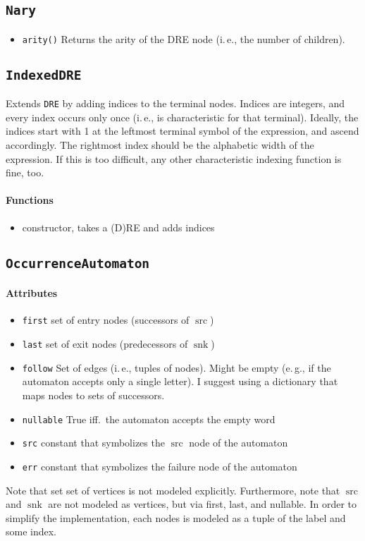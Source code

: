 \documentclass[a4paper,11pt, svgnames,titlepage]{article}
\DeclareMathOperator{\src}{src}
\DeclareMathOperator{\snk}{snk}
\begin{document}
\subsection{\texttt{Nary}}\label{sec:des:nary}
\begin{itemize}
	\item\texttt{arity()} Returns the arity of the DRE node (i.\,e., the number of children).
\end{itemize}


\subsection{\texttt{IndexedDRE}}\label{sec:des:idre}
Extends \texttt{DRE} by adding indices to the terminal nodes. Indices are integers, and every index occurs only once (i.\,e., is characteristic for that terminal). Ideally, the indices start with 1 at the leftmost terminal symbol of the expression, and ascend accordingly. The rightmost index should be the alphabetic width of the expression. If this is too difficult, any other characteristic indexing function is fine, too.
\paragraph{Functions}
\begin{itemize}
	\item constructor, takes a (D)RE and adds indices
\end{itemize}

\subsection{\texttt{OccurrenceAutomaton}}\label{sec:des:oa}
\paragraph{Attributes}
\begin{itemize}
	\item\texttt{first} set of entry nodes (successors of $\src$)
	\item\texttt{last} set of exit nodes (predecessors of $\snk$)
	\item\texttt{follow} Set of edges (i.\,e., tuples of nodes). Might be empty (e.\,g., if the automaton accepts only a single letter). I suggest using a dictionary that maps nodes to sets of successors. 
	\item\texttt{nullable} True iff.\ the automaton accepts the empty word
	\item\texttt{src} constant that symbolizes the $\src$ node of the automaton
	\item\texttt{err} constant that symbolizes the failure node of the automaton	
\end{itemize}
Note that set set of vertices is not modeled explicitly. Furthermore, note that $\src$ and $\snk$ are not modeled as vertices, but via first, last, and nullable. In order to simplify the implementation, each nodes is modeled as a tuple of the label and some index.
\end{document}
